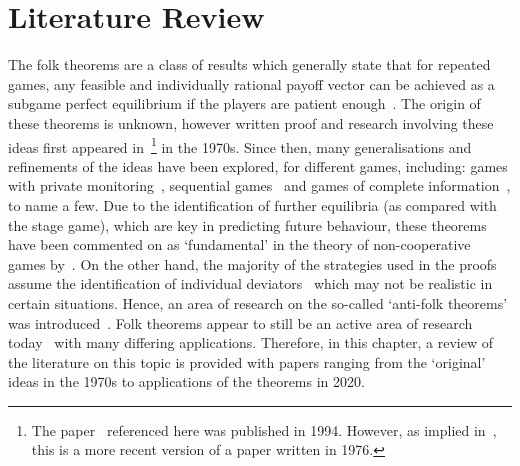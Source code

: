 \chapter{Literature Review}\label{ch:Lit_Review}

The folk theorems are a class of results which generally state that for repeated
games, any feasible and individually rational payoff vector can be achieved as a
subgame perfect equilibrium if the players are patient enough~\cite{Li2019}. The
origin of these theorems is unknown, however written proof and
research involving these ideas first appeared
in~\cite{aumann1976long,Friedman1971,Rubinstein1979}\footnote{The
paper~\cite{aumann1976long} referenced here was published in 1994. However, as
implied in~\cite{Abreu1994}, this is a more recent version of a paper written in 1976.} in the 1970s. Since then,
many generalisations and refinements of
the ideas have been explored, for different games, including:
games with private monitoring~\cite{Hoerner2006,Matsushima2004, Peski2012}, sequential
games~\cite{Bhaskar1998,Gossner1996,Wen2002} and games of complete
information~\cite{Abreu1994,Benoit_1985,Bernergard2019}, to
name a few. Due to the identification of further equilibria (as compared with
the stage game), which are key in predicting future behaviour, these theorems
have been commented on as `fundamental' in the theory of non-cooperative
games by~\cite{Hoerner2006, Li2015}. On the other hand, the majority of the strategies used in the
proofs assume the identification of individual deviators~\cite{Masso1989} which may not
be realistic in certain situations. Hence, an area of research on the so-called
`anti-folk theorems' was introduced~\cite{Masso1989,Peski2012,Yoon2001}. Folk theorems appear to still be an
active area of research today~\cite{Ikeda2020, Parras2020, Wang2020} with many differing applications.
Therefore, in this chapter, a review of the literature on this topic is provided
with papers ranging from the `original' ideas in the 1970s to applications of
the theorems in 2020. 


